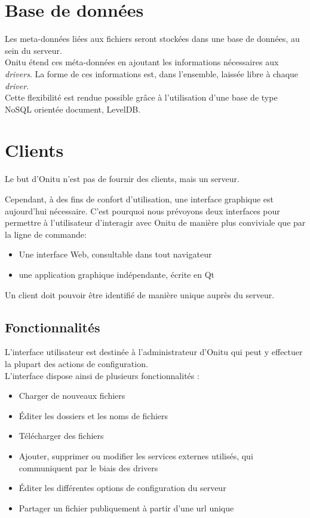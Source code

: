 \section{Base de données}
Les meta-données liées aux fichiers seront stockées dans une base de données, au sein du serveur.\\

Onitu étend ces méta-données en ajoutant les informations nécessaires aux \textit{drivers}. La forme de ces informations est, dans l'ensemble, laissée libre à chaque \textit{driver}.\\

Cette flexibilité est rendue possible grâce à l'utilisation d'une base de type NoSQL orientée document, LevelDB.

\section{Clients}

Le but d'Onitu n'est pas de fournir des clients, mais un serveur.

Cependant, à des fins de confort d'utilisation, une interface graphique est aujourd'hui nécessaire. C'est pourquoi nous prévoyons deux interfaces pour permettre à l'utilisateur d'interagir avec Onitu de manière plus conviviale que par la ligne de commande:
\begin{itemize}
\renewcommand{\labelitemi}{$\bullet$}
	\item Une interface Web, consultable dans tout navigateur
	\item une application graphique indépendante, écrite en Qt
\end{itemize}

Un client doit pouvoir être identifié de manière unique auprès du serveur.

\subsection{Fonctionnalités}

L'interface utilisateur est destinée à l'administrateur d'Onitu qui peut y effectuer la plupart des actions de configuration.\\

L'interface dispose ainsi de plusieurs fonctionnalités :
\begin{itemize}
\renewcommand{\labelitemi}{$\bullet$}
    \item Charger de nouveaux fichiers
    \item Éditer les dossiers et les noms de fichiers
    \item Télécharger des fichiers
    \item Ajouter, supprimer ou modifier les services externes utilisés, qui communiquent par le biais des drivers
    \item Éditer les différentes options de configuration du serveur
    \item Partager un fichier publiquement à partir d'une url unique
\end{itemize}


